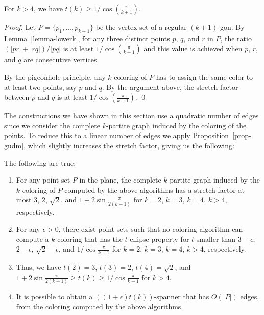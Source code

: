 \documentclass[pdftex,leqno,fleqn,12pts]{llncs}
\begin{document}
\begin{lemma}  \label{prop-lbkoff} 
For $k>4$, we have $t(k)\geq 1/ \cos(\frac{\pi}{k+1})$.
\end{lemma}
\begin{proof} 
Let $P=\{p_1,\ldots,p_{k+1}\}$ be the vertex set of a regular 
$(k+1)$-gon. 
By Lemma~\ref{lemma-lowerk}, for any three distinct 
points $p$, $q$, and $r$ in $P$, 
the ratio $(|pr|+|rq|)/|pq|$ is at least $1/ \cos(\frac{\pi}{k+1})$ and 
this value is achieved when $p$, $r$, and $q$ are 
consecutive vertices. 


By the pigeonhole principle, any $k$-coloring of $P$ has to assign the 
same color to at least two points, say $p$ and $q$. By the argument 
above, the stretch factor between $p$ and $q$ is at least 
$1/ \cos(\frac{\pi}{k+1})$.
\qed 
\end{proof}






The constructions we have shown in this section use a quadratic number of edges since we 
consider the complete $k$-partite graph induced by the coloring of the points. 
To reduce this to a linear number of edges we apply Proposition~\ref{prop-gudm}, 
which slightly increases the stretch factor, giving us the following:




\begin{theorem}
The following are true:
\begin{enumerate}
\item 
For any point set $P$ in the plane, the complete $k$-partite graph induced by the $k$-coloring 
of $P$ computed by the above algorithms has a stretch factor at most
$3$, $2$, $\sqrt{2}$, and $1+ 2 \sin \frac{\pi}{2(k+1)}$ for $k=2$, $k=3$,
$k=4$, $k>4$, respectively. 



\item
For any $\epsilon>0$, there exist point sets such that no coloring algorithm can 
compute a $k$-coloring that has the $t$-ellipse property for $t$ smaller than
$3-\epsilon$, $2-\epsilon$, $\sqrt{2}-\epsilon$, and $1/ \cos \frac{\pi}{k+1}$ 
for $k=2$, $k=3$, $k=4$, $k>4$, respectively.



\item
Thus, we have
$t(2)= 3$, $t(3)= 2$, $t(4) = \sqrt{2}$, and 
$ 1+ 2 \sin \frac{\pi}{2(k+1)} \geq  t(k) \geq 1/ \cos \frac{\pi}{k+1}$ 
for $k > 4$.

\item
It is possible to obtain a $((1+\epsilon)t(k))$-spanner that has $O(|P|)$ edges, 
from 
the coloring computed by the above algorithms.


\end{enumerate}
\end{theorem}
\end{document}
